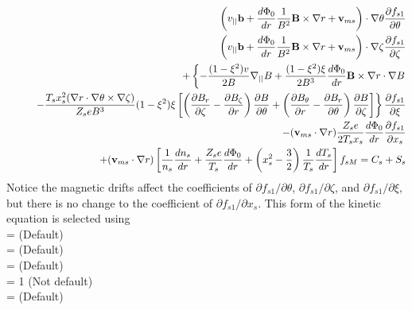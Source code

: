 \begin{eqnarray}
&&\left(v_{||}{\mathbf b} + \frac{d\Phi_0}{dr} \frac{1}{B^2} {\mathbf B}\times\nabla r  + {\mathbf v}_{ms}\right) \cdot \nabla \theta \frac{\partial f_{s1}}{\partial \theta} \\
&&\left(v_{||}{\mathbf b} + \frac{d\Phi_0}{dr} \frac{1}{B^2} {\mathbf B}\times\nabla r  + {\mathbf v}_{ms}\right) \cdot \nabla \zeta \frac{\partial f_{s1}}{\partial \zeta} \nonumber \\
&&+ \left\{ - \frac{(1-\xi^2)v}{2B} \nabla_{||} B
+\frac{(1-\xi^2)\xi}{2B^3} \frac{d\Phi_0}{dr}{\mathbf B}\times\nabla r\cdot\nabla B \right. \nonumber \\
&& \left. \hspace{0.25in} -\frac{T_s x_s^2 (\nabla r\cdot\nabla\theta\times\nabla\zeta)}{Z_s e B^3} (1-\xi^2)\xi
\left[ \left( \frac{\partial B_r}{\partial \zeta} - \frac{\partial B_\zeta}{\partial r}\right)\frac{\partial B}{\partial\theta}
+ \left(\frac{\partial B_\theta}{\partial r} - \frac{\partial B_r}{\partial\theta}\right) \frac{\partial B}{\partial\zeta}\right]
\right\}
 \frac{\partial f_{s1}}{\partial \xi} \nonumber \\
&&-({\mathbf v}_{ms} \cdot\nabla r) \frac{Z_s e}{2 T_s x_s} \frac{d\Phi_0}{dr} \frac{\partial f_{s1}}{\partial x_s} \nonumber \\
&&+ ({\mathbf v}_{ms} \cdot \nabla r) \left[ \frac{1}{n_s} \frac{dn_s}{dr} + \frac{Z_s e}{T_s} \frac{d\Phi_0}{dr} + \left(x_s^2-\frac{3}{2}\right) \frac{1}{T_s} \frac{dT_s}{dr}\right] f_{sM}
 = C_s + S_s \nonumber
\end{eqnarray}
Notice the magnetic drifts affect the coefficients of $\partial f_{s1}/\partial \theta$, $\partial f_{s1}/\partial \zeta$, 
and $\partial f_{s1}/\partial \xi$,
but there is no change to the coefficient of $\partial f_{s1}/\partial x_s$.
This form of the kinetic equation is selected using \\
 = \true  \;\;\; (Default) \\
 = \true \;\;\; (Default) \\
 = \false \;\;\; (Default) \\
 = 1 \;\;\; (Not default) \\
 = \false \;\;\; (Default) %



